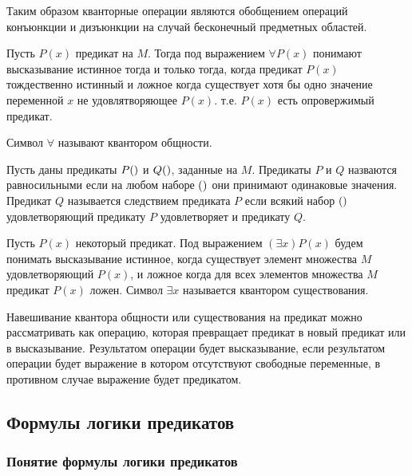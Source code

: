\documentclass[letterpaper, 10pt]{article}
\theoremstyle{definition}
\begin{document}
	Таким образом кванторные операции являются обобщением операций конъюнкции и
	дизъюнкции на случай бесконечный предметных областей.

	Пусть $P(x)$ предикат на $M$. Тогда под выражением $\forall P(x)$ понимают
	высказывание истинное тогда и только тогда, когда предикат $P(x)$
	тождественно истинный и ложное когда существует хотя бы одно значение
	переменной $x$ не удовлятворяющее $P(x)$. т.е. $P(x)$ есть опровержимый
	предикат.

	Символ $\forall$ называют квантором общности. 

	Пусть даны предикаты $P(\rseq x)$ и $Q(\rseq x)$, заданные на $M$. Предикаты
	$P$ и $Q$ назваются равносильными если на любом наборе $(\rseq a)$ они
	принимают одинаковые значения. Предикат $Q$ называется следствием предиката
	$P$ если всякий набор $(\rseq a)$ удовлетворяющий предикату $P$
	удовлетворяет и предикату $Q$.

	Пусть $P(x)$ некоторый предикат. Под выражением $(\exists x )P(x)$ будем
	понимать высказывание истинное, когда существует элемент множества $M$
	удовлетворяющий $P(x)$, и ложное когда для всех элементов множества $M$
	предикат $P(x)$ ложен. Символ $\exists x$ называется квантором
	существования.

	Навешивание квантора общности или существования на предикат можно
	рассматривать как операцию, которая превращает предикат в новый предикат или
	в высказывание. Результатом операции будет высказывание, если результатом
	операции будет выражение в котором отсутствуют свободные переменные, в
	противном случае выражение будет предикатом.

	\subsection{Формулы логики предикатов}

	\subsubsection{Понятие формулы логики предикатов}
\end{document}
